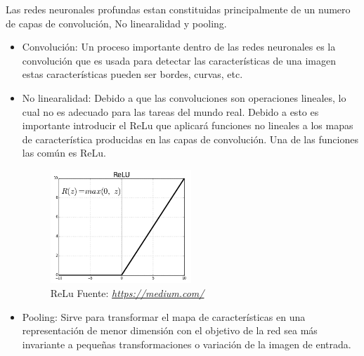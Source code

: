 Las redes neuronales profundas estan constituidas principalmente de un numero de capas de convolución, No linearalidad y pooling.
\begin{itemize}
	\item Convolución:
	Un proceso importante dentro de las redes neuronales es la convolución que es usada para detectar las características de una imagen estas características pueden ser bordes, curvas, etc.
	\item No linearalidad:
	Debido a que las convoluciones son operaciones lineales, lo cual no es adecuado para las tareas del mundo real. Debido a esto es importante introducir el ReLu que aplicará funciones no lineales a los mapas de característica producidas en las capas de convolución.
	Una de las funciones las común es ReLu.
	\begin{figure}[H]
		\centering
		\includegraphics[width=0.5\textwidth]{Figures/relu.png}
		\caption{ReLu  Fuente:
			\href{https://medium.com/@kanchansarkar/relu-not-a-differentiable-function-why-used-in-gradient-based-optimization-7fef3a4cecec}{\textit{https://medium.com/}}
			 }
		\label{ReLu}
	\end{figure}

	
	\item Pooling:
	Sirve para transformar el mapa de características en una representación de menor dimensión con el objetivo de la red sea más invariante a pequeñas transformaciones o variación de la imagen de entrada.
\end{itemize}






\afterpage{\blankpage}